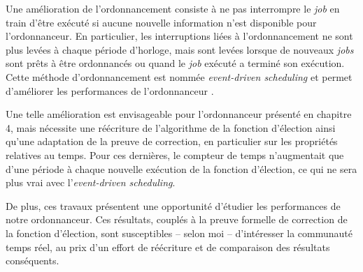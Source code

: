 		Une amélioration de l'ordonnancement consiste à ne pas interrompre le \emph{job} en train d'être exécuté si aucune nouvelle information n'est disponible pour l'ordonnanceur. En particulier, les interruptions liées à l'ordonnancement ne sont plus levées à chaque période d'horloge, mais sont levées lorsque de nouveaux \emph{jobs} sont prêts à être ordonnancés ou quand le \emph{job} exécuté a terminé son exécution. Cette méthode d'ordonnancement est nommée \emph{event-driven scheduling} et permet d'améliorer les performances de l'ordonnanceur \cite{brandenburg2009implementation}.

		Une telle amélioration est envisageable pour l'ordonnanceur présenté en chapitre 4, mais nécessite une réécriture de l'algorithme de la fonction d'élection ainsi qu'une adaptation de la preuve de correction, en particulier sur les propriétés relatives au temps. Pour ces dernières, le compteur de temps n'augmentait que d'une période à chaque nouvelle exécution de la fonction d'élection, ce qui ne sera plus vrai avec l'\emph{event-driven scheduling}.

		De plus, ces travaux présentent une opportunité d'étudier les performances de notre ordonnanceur. Ces résultats, couplés à la preuve formelle de correction de la fonction d'élection, sont susceptibles -- selon moi -- d'intéresser la communauté temps réel, au prix d'un effort de réécriture et de comparaison des résultats conséquents.
